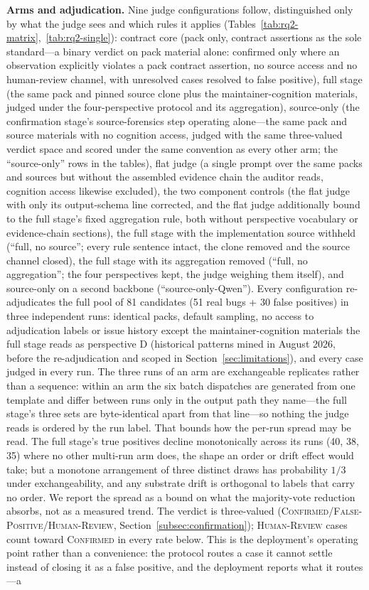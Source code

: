 \documentclass[acmsmall,screen,review,anonymous]{acmart}
\begin{document}
\textbf{Arms and adjudication.}
Nine judge configurations follow, distinguished only by what the judge sees and which rules it applies (Tables~\ref{tab:rq2-matrix},~\ref{tab:rq2-single}): contract core (pack only, contract assertions as the sole standard---a binary verdict on pack material alone: confirmed only where an observation explicitly violates a pack contract assertion, no source access and no human-review channel, with unresolved cases resolved to false positive), full stage (the same pack and pinned source clone plus the maintainer-cognition materials, judged under the four-perspective protocol and its aggregation), source-only (the confirmation stage's source-forensics step operating alone---the same pack and source materials with no cognition access, judged with the same three-valued verdict space and scored under the same convention as every other arm; the ``source-only'' rows in the tables), flat judge (a single prompt over the same packs and sources but without the assembled evidence chain the auditor reads, cognition access likewise excluded), the two component controls (the flat judge with only its output-schema line corrected, and the flat judge additionally bound to the full stage's fixed aggregation rule, both without perspective vocabulary or evidence-chain sections), the full stage with the implementation source withheld (``full, no source''; every rule sentence intact, the clone removed and the source channel closed), the full stage with its aggregation removed (``full, no aggregation''; the four perspectives kept, the judge weighing them itself), and source-only on a second backbone (``source-only-Qwen''). Every configuration re-adjudicates the full pool of 81 candidates (51 real bugs + 30 false positives) in three independent runs: identical packs, default sampling, no access to adjudication labels or issue history except the maintainer-cognition materials the full stage reads as perspective D (historical patterns mined in August 2026, before the re-adjudication and scoped in Section~\ref{sec:limitations}), and every case judged in every run. The three runs of an arm are exchangeable replicates rather than a sequence: within an arm the six batch dispatches are generated from one template and differ between runs only in the output path they name---the full stage's three sets are byte-identical apart from that line---so nothing the judge reads is ordered by the run label. That bounds how the per-run spread may be read. The full stage's true positives decline monotonically across its runs (40, 38, 35) where no other multi-run arm does, the shape an order or drift effect would take; but a monotone arrangement of three distinct draws has probability $1/3$ under exchangeability, and any substrate drift is orthogonal to labels that carry no order. We report the spread as a bound on what the majority-vote reduction absorbs, not as a measured trend. The verdict is three-valued (\textsc{Confirmed}/\textsc{False-Positive}/\textsc{Human-Review}, Section~\ref{subsec:confirmation}); \textsc{Human-Review} cases count toward \textsc{Confirmed} in every rate below. This is the deployment's operating point rather than a convenience: the protocol routes a case it cannot settle instead of closing it as a false positive, and the deployment reports what it routes---a 
\end{document}
